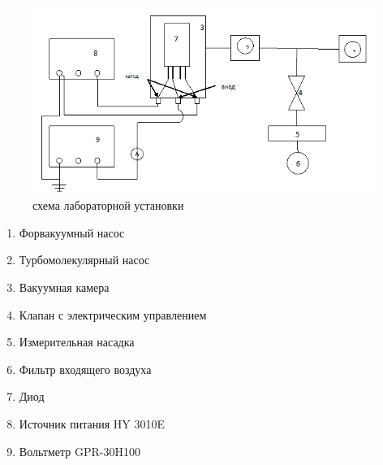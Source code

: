 \documentclass[a4paper]{article}
\begin{document}
\begin{figure}[h]
    \centering
    \includegraphics[width=13cm]{./Diode/setup.PNG}
    \caption{схема лабораторной установки}
    \label{fig:vac}
\end{figure}
\begin{enumerate}
    \item Форвакуумный насос
\item Турбомолекулярный насос
\item Вакуумная камера
\item Клапан с электрическим управлением
\item Измерительная насадка
\item Фильтр входящего воздуха
\item Диод
\item Источник питания HY 3010E
\item Вольтметр GPR-30H100
\end{enumerate}
\end{document}
